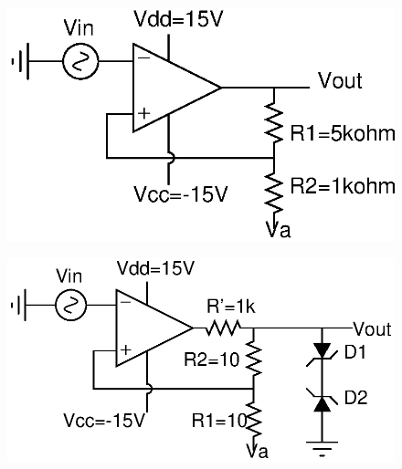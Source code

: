 \documentclass[12pt]{article}
\begin{document}
\begin{figure}[h!]
\centering
\includegraphics[scale = 1]{Exp_2_a.eps}
\end{figure}

\begin{figure}[h!]
\centering
\includegraphics[scale = 1]{Exp_2_b.eps}
\end{figure}

\end{document}
